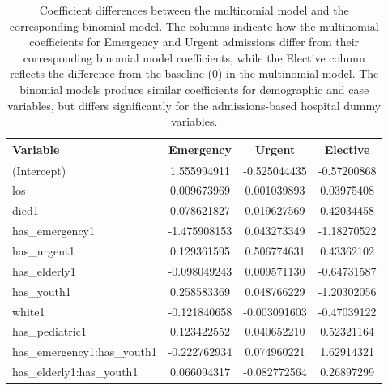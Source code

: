 \documentclass[11pt]{article}
\begin{document}
\begin{table}[ht]
\centering
\begin{tabular}{lccc}
\hline
\textbf{Variable} & \textbf{Emergency} & \textbf{Urgent} & \textbf{Elective} \\
\hline
(Intercept) & 1.555994911 & -0.525044435 & -0.57200868 \\
los & 0.009673969 & 0.001039893 & 0.03975408 \\
died1 & 0.078621827 & 0.019627569 & 0.42034458 \\
has\_emergency1 & -1.475908153 & 0.043273349 & -1.18270522 \\
has\_urgent1 & 0.129361595 & 0.506774631 & 0.43362102 \\
has\_elderly1 & -0.098049243 & 0.009571130 & -0.64731587 \\
has\_youth1 & 0.258583369 & 0.048766229 & -1.20302056 \\
white1 & -0.121840658 & -0.003091603 & -0.47039122 \\
has\_pediatric1 & 0.123422552 & 0.040652210 & 0.52321164 \\
has\_emergency1:has\_youth1 & -0.222762934 & 0.074960221 & 1.62914321 \\
has\_elderly1:has\_youth1 & 0.066094317 & -0.082772564 & 0.26897299 \\
\hline
\end{tabular}
\caption{Coefficient differences between the multinomial model and the corresponding binomial model. The columns indicate how the multinomial coefficients for Emergency and Urgent admissions differ from their corresponding binomial model coefficients, while the Elective column reflects the difference from the baseline (0) in the multinomial model. The binomial models produce similar coefficients for demographic and case variables, but differs significantly for the admissions-based hospital dummy variables.}
\label{tab:coeff_differences}
\end{table}
\end{document}
